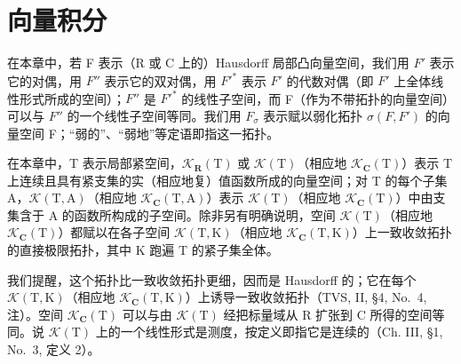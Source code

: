 \chapter{向量积分}

在本章中，若 F 表示（R 或 C 上的）Hausdorff 局部凸向量空间，我们用 \(F'\) 表示它的对偶，用 \(F''\) 表示它的双对偶，用 \(F'^*\) 表示 \(F'\) 的代数对偶（即 \(F'\) 上全体线性形式所成的空间）；\(F''\) 是 \(F'^*\) 的线性子空间，而 F（作为不带拓扑的向量空间）可以与 \(F''\) 的一个线性子空间等同。我们用 \(F_\sigma\) 表示赋以弱化拓扑 \(\sigma(F, F')\) 的向量空间 F；“弱的”、“弱地”等定语即指这一拓扑。

在本章中，T 表示局部紧空间，\(\mathcal{K}_{\mathbf{R}}(\mathrm{T})\) 或 \(\mathcal{K}(\mathrm{T})\)（相应地 \(\mathcal{K}_{\mathbf{C}}(\mathrm{T})\)）表示 T 上连续且具有紧支集的实（相应地复）值函数所成的向量空间；对 T 的每个子集 A，\(\mathcal{K}(\mathrm{T},\mathrm{A})\)（相应地 \(\mathcal{K}_{\mathbf{C}}(\mathrm{T},\mathrm{A})\)）表示 \(\mathcal{K}(\mathrm{T})\)（相应地 \(\mathcal{K}_{\mathbf{C}}(\mathrm{T})\)）中由支集含于 A 的函数所构成的子空间。除非另有明确说明，空间 \(\mathcal{K}(\mathrm{T})\)（相应地 \(\mathcal{K}_{\mathbf{C}}(\mathrm{T})\)）都赋以在各子空间 \(\mathcal{K}(\mathrm{T},\mathrm{K})\)（相应地 \(\mathcal{K}_{\mathbf{C}}(\mathrm{T},\mathrm{K})\)）上一致收敛拓扑的直接极限拓扑，其中 K 跑遍 T 的紧子集全体。

我们提醒，这个拓扑比一致收敛拓扑更细，因而是 Hausdorff 的；它在每个 \(\mathcal{K}(\mathrm{T},\mathrm{K})\)（相应地 \(\mathcal{K}_{\mathbf{C}}(\mathrm{T},\mathrm{K})\)）上诱导一致收敛拓扑（TVS, II, §4, No.~4, 注）。空间 \(\mathcal{K}_{\mathbf{C}}(\mathrm{T})\) 可以与由 \(\mathcal{K}(\mathrm{T})\) 经把标量域从 R 扩张到 C 所得的空间等同。说 \(\mathcal{K}(\mathrm{T})\) 上的一个线性形式是测度，按定义即指它是连续的（Ch. III, §1, No.~3, 定义 2）。

